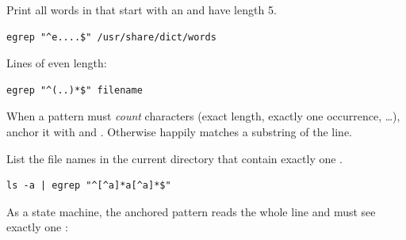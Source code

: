 \begin{example}
Print all words in  that start with an  and
have length 5.
\begin{lstlisting}[style=bash]
egrep "^e....$" /usr/share/dict/words
\end{lstlisting}
\end{example}

\begin{example}
Lines of even length:
\begin{lstlisting}[style=bash]
egrep "^(..)*$" filename
\end{lstlisting}
\end{example}

\begin{important}[Anchors]
When a pattern must \emph{count} characters (exact length, exactly one
occurrence, \dots), anchor it with \code{\^{}} and \code{\$}. Otherwise
 happily matches a substring of the line.
\end{important}

\begin{example}
List the file names in the current directory that contain exactly one .
\begin{lstlisting}[style=bash]
ls -a | egrep "^[^a]*a[^a]*$"
\end{lstlisting}
As a state machine, the anchored pattern reads the whole line and must see exactly one
:
\begin{center}
\end{center}
\end{example}

